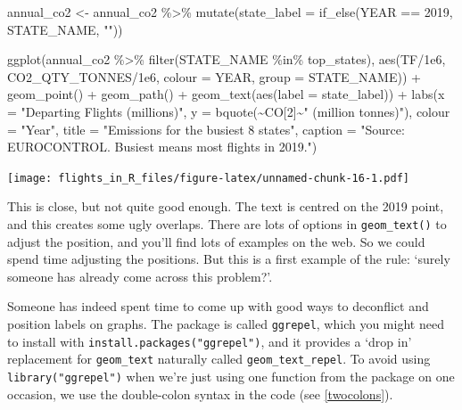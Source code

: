 \documentclass[
]{book}
\newenvironment{Shaded}{\begin{snugshade}}{\end{snugshade}}
\newcommand{\AttributeTok}[1]{\textcolor[rgb]{0.77,0.63,0.00}{#1}}
\newcommand{\DecValTok}[1]{\textcolor[rgb]{0.00,0.00,0.81}{#1}}
\newcommand{\FloatTok}[1]{\textcolor[rgb]{0.00,0.00,0.81}{#1}}
\newcommand{\FunctionTok}[1]{\textcolor[rgb]{0.00,0.00,0.00}{#1}}
\newcommand{\NormalTok}[1]{#1}
\newcommand{\OtherTok}[1]{\textcolor[rgb]{0.56,0.35,0.01}{#1}}
\newcommand{\SpecialCharTok}[1]{\textcolor[rgb]{0.00,0.00,0.00}{#1}}
\newcommand{\StringTok}[1]{\textcolor[rgb]{0.31,0.60,0.02}{#1}}
\begin{document}
\begin{Shaded}
\begin{Highlighting}[]
\NormalTok{annual\_co2 }\OtherTok{\textless{}{-}}\NormalTok{ annual\_co2 }\SpecialCharTok{\%\textgreater{}\%} 
  \FunctionTok{mutate}\NormalTok{(}\AttributeTok{state\_label =} \FunctionTok{if\_else}\NormalTok{(YEAR }\SpecialCharTok{==} \DecValTok{2019}\NormalTok{, STATE\_NAME, }\StringTok{""}\NormalTok{))}

\FunctionTok{ggplot}\NormalTok{(annual\_co2 }\SpecialCharTok{\%\textgreater{}\%} 
         \FunctionTok{filter}\NormalTok{(STATE\_NAME }\SpecialCharTok{\%in\%}\NormalTok{ top\_states), }
       \FunctionTok{aes}\NormalTok{(TF}\SpecialCharTok{/}\FloatTok{1e6}\NormalTok{, CO2\_QTY\_TONNES}\SpecialCharTok{/}\FloatTok{1e6}\NormalTok{, }
           \AttributeTok{colour =}\NormalTok{ YEAR, }\AttributeTok{group =}\NormalTok{ STATE\_NAME)) }\SpecialCharTok{+}
  \FunctionTok{geom\_point}\NormalTok{() }\SpecialCharTok{+} 
  \FunctionTok{geom\_path}\NormalTok{() }\SpecialCharTok{+}
  \FunctionTok{geom\_text}\NormalTok{(}\FunctionTok{aes}\NormalTok{(}\AttributeTok{label =}\NormalTok{ state\_label)) }\SpecialCharTok{+}
  \FunctionTok{labs}\NormalTok{(}\AttributeTok{x =} \StringTok{"Departing Flights (millions)"}\NormalTok{, }
       \AttributeTok{y =} \FunctionTok{bquote}\NormalTok{(}\SpecialCharTok{\textasciitilde{}}\NormalTok{CO[}\DecValTok{2}\NormalTok{]}\SpecialCharTok{\textasciitilde{}}\StringTok{" (million tonnes)"}\NormalTok{),}
       \AttributeTok{colour =} \StringTok{"Year"}\NormalTok{,}
       \AttributeTok{title =} \StringTok{"Emissions for the busiest 8 states"}\NormalTok{,}
       \AttributeTok{caption =} \StringTok{"Source: EUROCONTROL. \textquotesingle{}Busiest\textquotesingle{} means most flights in 2019."}\NormalTok{)}
\end{Highlighting}
\end{Shaded}

\texttt{[image: flights\_in\_R\_files/figure-latex/unnamed-chunk-16-1.pdf]}

This is close, but not quite good enough. The text is centred on the 2019 point, and this creates some ugly overlaps. There are lots of options in \texttt{geom\_text()} to adjust the position, and you'll find lots of examples on the web. So we could spend time adjusting the positions. But this is a first example of the rule: `surely someone has already come across this problem?'.

Someone has indeed spent time to come up with good ways to deconflict and position labels on graphs. The package is called \texttt{ggrepel}, which you might need to install with \texttt{install.packages("ggrepel")}, and it provides a `drop in' replacement for \texttt{geom\_text} naturally called \texttt{geom\_text\_repel}. To avoid using \texttt{library("ggrepel")} when we're just using one function from the package on one occasion, we use the double-colon syntax in the code (see \ref{twocolons}).
\end{document}
